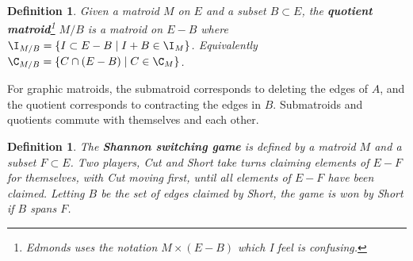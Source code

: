 \documentclass{article}
\newtheorem{definition}[theorem]{Definition}
\newcommand*{\defn}[1]{\textbf{\textit{\boldmath #1}}}
\begin{document}
\begin{definition}
  Given a matroid $M$ on $E$ and a subset $B \subset E$, the \defn{quotient matroid}\footnote{Edmonds uses the notation $M \times (E - B)$ which I feel is confusing.} $M/B$ is a matroid on $E - B$ where $\I_{M/B} = \{I \subset E - B \mid I + B \in \I_M\}$.  Equivalently $\C_{M/B} = \{C \cap (E - B) \mid C \in \C_M\}$.
\end{definition}

For graphic matroids, the submatroid corresponds to deleting the edges of $A$, and the quotient corresponds to contracting the edges in $B$.  Submatroids and quotients commute with themselves and each other.

\begin{definition}
  The \defn{Shannon switching game} is defined by a matroid $M$ and a subset $F \subset E$.
  Two players, \emph{Cut} and \emph{Short} take turns claiming elements of $E - F$ for themselves, with Cut moving first, until all elements of $E - F$ have been claimed.
  Letting $B$ be the set of edges claimed by Short,
  the game is won by Short if $B$ spans $F$.
\end{definition}
\end{document}
